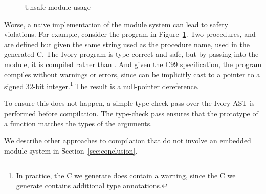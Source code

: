 \begin{figure}[h]
\caption{Unsafe module usage}
\label{fig:unsafe-module}
\end{figure}

Worse, a naive implementation of the module system can lead to safety
violations. For example, consider the program in
Figure~\ref{fig:unsafe-module}. Two procedures,  and 
are defined but given the same string used as the procedure name, used in the
generated C. The Ivory program is type-correct and safe, but by passing
 into the module, it is compiled rather than . And given
the C99 specification, the program compiles without warnings or errors, since
 can be implicitly cast to a pointer to a signed 32-bit
integer.\footnote{In practice, the C we generate does contain a warning, since
  the C we generate contains additional type annotations.} The result is a
null-pointer dereference.

To ensure this does not happen, a simple type-check pass over the Ivory AST is
performed before compilation. The type-check pass ensures that the prototype of
a function matches the types of the arguments.

We describe other approaches to compilation that do not involve an embedded
module system in Section~\ref{sec:conclusion}.
